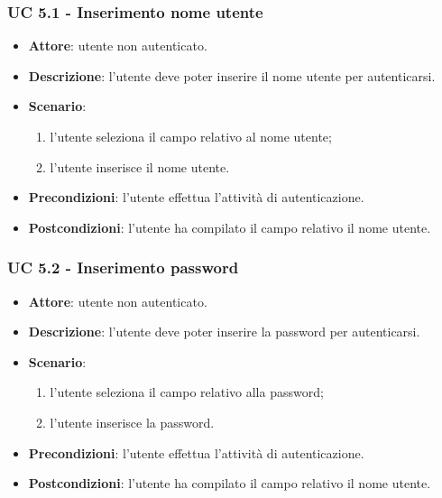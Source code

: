 \subsubsection{UC 5.1 - Inserimento nome utente}
\begin{itemize}
    \item \textbf{Attore}: utente non autenticato.
    \item \textbf{Descrizione}: l'utente deve poter inserire il nome utente per autenticarsi.
    \item \textbf{Scenario}:
    \begin{enumerate}
        \item l'utente seleziona il campo relativo al nome utente;
        \item l'utente inserisce il nome utente.
    \end{enumerate}
    \item \textbf{Precondizioni}: l'utente effettua l'attività di autenticazione.
    \item \textbf{Postcondizioni}: l'utente ha compilato il campo relativo il nome utente.
\end{itemize}

\subsubsection{UC 5.2 - Inserimento password}
\begin{itemize}
    \item \textbf{Attore}: utente non autenticato.
    \item \textbf{Descrizione}: l'utente deve poter inserire la password per autenticarsi.
    \item \textbf{Scenario}:
    \begin{enumerate}
        \item l'utente seleziona il campo relativo alla password;
        \item l'utente inserisce la password.
    \end{enumerate}

    \item \textbf{Precondizioni}: l'utente effettua l'attività di autenticazione.
    \item \textbf{Postcondizioni}: l'utente ha compilato il campo relativo il nome utente.
\end{itemize}

